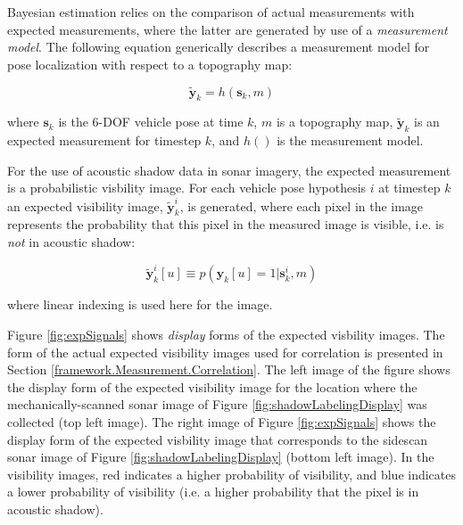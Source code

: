 Bayesian estimation relies on the comparison of actual measurements with expected measurements, where the latter are generated by use of a \emph{measurement model}.  
The following equation generically describes a measurement model for pose localization with respect to a topography map:

\begin{equation}
\tilde{\mathbf{y}}_k = h(\mathbf{s}_k, m)
\label{eq:genericMeasurementModel}
\end{equation}

\noindent where $\mathbf{s}_k$ is the 6-DOF vehicle pose at time $k$, $m$ is a topography map, $\tilde{\mathbf{y}}_k$ is an expected measurement for timestep $k$, and $h()$ is the measurement model.

For the use of acoustic shadow data in sonar imagery, the expected measurement is a probabilistic visbility image.
For each vehicle pose hypothesis $i$ at timestep $k$ an expected visibility image, $\tilde{\mathbf{y}}_k^{i}$, is generated, where each pixel in the image represents the probability that this pixel in the measured image is visible, i.e. is \emph{not} in acoustic shadow:

\begin{equation}
\tilde{\mathbf{y}}_k^{i}[u] \equiv p(\mathbf{y}_k[u] = 1 | \mathbf{s}_k^{i}, m)
\label{eq:PM}
\end{equation}

\noindent where linear indexing is used here for the image.  

Figure \ref{fig:expSignals} shows \emph{display} forms of the expected visbility images.  
The form of the actual expected visibility images used for correlation is presented in Section \ref{framework.Measurement.Correlation}.
The left image of the figure shows the display form of the expected visibility image for the location where the mechanically-scanned sonar image of Figure \ref{fig:shadowLabelingDisplay} was collected (top left image).
The right image of Figure \ref{fig:expSignals} shows the display form of the expected visbility image that corresponds to the sidescan sonar image of Figure \ref{fig:shadowLabelingDisplay} (bottom left image).
In the visibility images, red indicates a higher probability of visibility, and blue indicates a lower probability of visibility (i.e. a higher probability that the pixel is in acoustic shadow).

